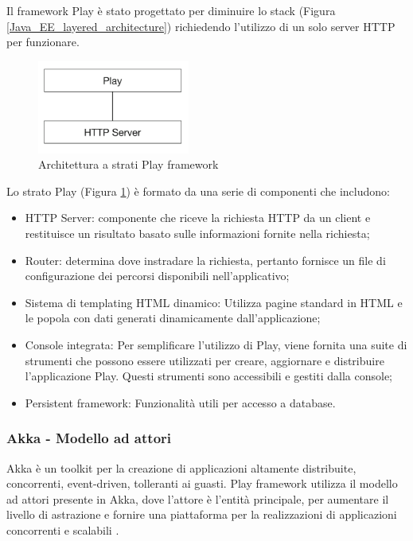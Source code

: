Il framework Play è stato progettato per diminuire lo stack (Figura \ref{Java_EE_layered_architecture})  richiedendo l'utilizzo di un solo server HTTP per funzionare.

\begin{figure}[H]
\centering
\includegraphics[width=5cm]{figures/Play_layered_architecture.png}
\caption{Architettura a strati Play framework \cite{play_framework_book}}
\label{Play_layered_architecture}
\end{figure}

Lo strato Play (Figura \ref{Play_layered_architecture}) è formato da una serie di componenti che includono:
\begin{itemize}
    \item HTTP Server: componente che riceve la richiesta HTTP da un client e restituisce un risultato basato sulle informazioni fornite nella richiesta;
    \item Router: determina dove instradare la richiesta, pertanto fornisce un file di configurazione dei percorsi disponibili nell'applicativo;
    \item Sistema di templating HTML dinamico: Utilizza pagine standard in HTML e le popola con dati generati dinamicamente dall'applicazione;
    \item Console integrata: Per semplificare l'utilizzo di Play, viene fornita una suite di strumenti che possono essere utilizzati per creare, aggiornare e distribuire l'applicazione Play. Questi strumenti sono accessibili e gestiti dalla console;
    \item Persistent framework: Funzionalità utili per accesso a database.
\end{itemize}
\subsubsection{Akka - Modello ad attori}

Akka è un toolkit per la creazione di applicazioni altamente distribuite, concorrenti, event-driven, tolleranti ai guasti. Play framework utilizza il modello ad attori presente in Akka, dove l'attore è l'entità principale, per aumentare il livello di astrazione e fornire una piattaforma per la realizzazioni di applicazioni concorrenti e scalabili \cite{akka}.

